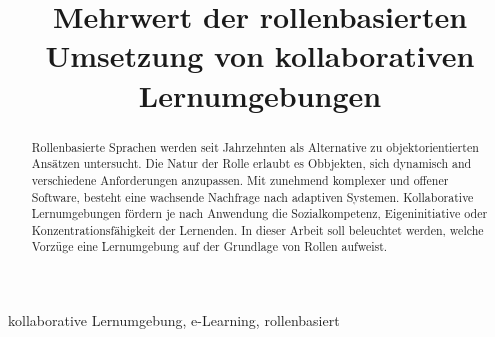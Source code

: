 \documentclass[conference]{IEEEtran}
\begin{document}
\title{Mehrwert der rollenbasierten Umsetzung von kollaborativen Lernumgebungen\\}


\author{
}



\maketitle

\begin{abstract} Rollenbasierte Sprachen werden seit Jahrzehnten als Alternative zu objektorientierten Ansätzen untersucht. Die Natur der Rolle erlaubt es Obbjekten, sich dynamisch and verschiedene Anforderungen anzupassen. Mit zunehmend komplexer und offener Software, besteht eine wachsende Nachfrage nach adaptiven Systemen. Kollaborative Lernumgebungen fördern je nach Anwendung die Sozialkompetenz, Eigeninitiative oder Konzentrationsfähigkeit der Lernenden. In dieser Arbeit soll beleuchtet werden, welche Vorzüge eine Lernumgebung auf der Grundlage von Rollen aufweist.
\end{abstract}

\begin{IEEEkeywords}
kollaborative Lernumgebung, e-Learning, rollenbasiert
\end{IEEEkeywords}
\end{document}

